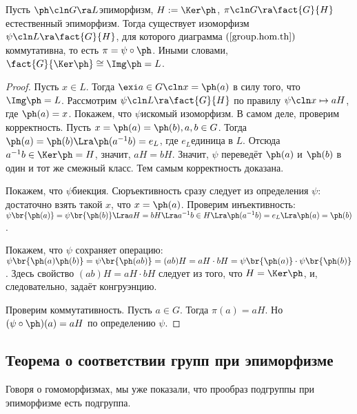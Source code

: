 \documentclass[a4paper]{article}
\newcommand{\kph}{\Ker \ph}
\begin{document}
\begin{theorem}
Пусть $\ph\cln G \ra L$\т эпиморфизм, $H := \kph$, $\pi\cln G \ra \fact{G}{H}$\т  естественный эпиморфизм.
Тогда существует изоморфизм $\psi\cln L \ra \fact{G}{H}$, для которого диаграмма $(\ref{group.hom.th})$
коммутативна, то есть $\pi = \psi \circ \ph$. 
Иными словами, $\fact{G}{\kph} \cong \Img \ph =L$.
\end{theorem}
\begin{proof}
Пусть $x \in L$. Тогда $\exi a \in G\cln x=\ph(a)$ в силу того, что $\Img \ph = L$.  Рассмотрим
$\psi\cln L \ra \fact{G}{H}$ по правилу $\psi\cln x \mapsto aH$, где $\ph(a)=x$. Покажем, что $\psi$\т искомый изоморфизм. В
самом деле, проверим корректность. Пусть $x=\ph(a)=\ph(b), a,b \in G$. Тогда $\ph(a)=\ph(b) \Lra
\ph(a^{-1}b)=e_L$, где $e_L$\т единица в $L$. Отсюда $a^{-1}b \in \kph = H$, значит, $aH=bH$. Значит, $\psi$
переведёт $\ph(a)$ и $\ph(b)$ в один и тот же смежный класс. Тем самым корректность доказана.

Покажем, что $\psi$\т биекция. Сюръективность сразу следует из определения  $\psi$: достаточно взять такой
$x$, что $x=\ph(a)$. Проверим инъективность: $\psi\br{\ph(a)} =\psi\br{\ph(b)} \Lra aH=bH \Lra a^{-1}b \in H
\Lra \ph(a^{-1}b) = e_L \Lra \ph(a)=\ph(b)$.

Покажем, что $\psi$ сохраняет операцию: $\psi\br{\ph(a)\ph(b)}=\psi\br{\ph(ab)}=(ab)H=aH \cdot
bH=\psi\br{\ph(a)}\cdot\psi\br{\ph(b)}$. Здесь свойство $(ab)H =aH \cdot bH$ следует из того, что $H =\kph$,
и, следовательно, задаёт конгруэнцию.

Проверим коммутативность. Пусть $a \in G$. Тогда $\pi(a)=aH$. Но $(\psi \circ \ph)(a)=aH$ по определению
$\psi$.
\end{proof}

\subsection{Теорема о соответствии групп при эпиморфизме}

Говоря о гомоморфизмах, мы уже показали, что прообраз подгруппы при эпиморфизме есть подгруппа.
\end{document}
